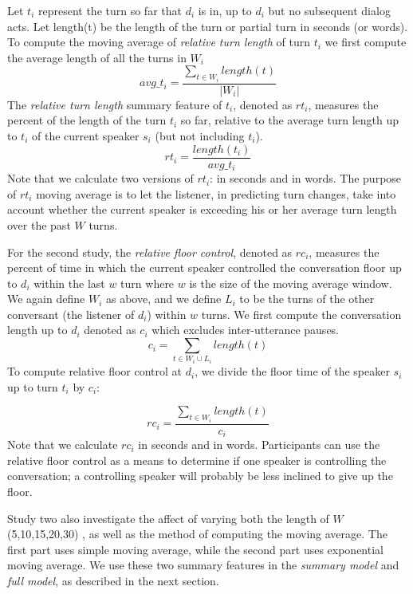      Let $t_i$ represent the turn so far that $d_i$ is in, up to $d_i$ but no subsequent dialog acts. Let length(t) be the length of the turn or partial turn in seconds (or words). To compute the moving average of  \textit{relative turn length} of turn $t_i$ we first compute the average length of all the turns in $W_i$
%
    \begin{equation}
     avg\_t_i = \frac{\sum_{t \in W_i} length(t)}{|W_i|}
     \end{equation}
     The \textit{relative turn length} summary feature of $t_i$, denoted as $rt_i$, measures the percent of the length of the turn $t_i$ so far, relative to the average turn length up to $t_i$ of the current speaker $s_i$ (but not including $t_i$).
%
     \begin{equation}
            rt_i =  \frac{length(t_i)} {avg\_t_i}
     \end{equation}
     Note that we calculate two versions of $rt_i$: in seconds and in words.  The purpose of $rt_i$ moving average is to let the listener, in predicting turn changes, take into account whether the current speaker is exceeding his or her average turn length over the past $W$ turns.

     For the second study, the \textit{relative floor control}, denoted as $rc_i$, measures the percent of time in which the current speaker controlled the conversation floor up to $d_i$ within the last $w$ turn where $w$ is the size of the moving average window. We again define $W_i$ as above, and we define $L_i$ to be the turns of the other conversant (the listener of $d_i$) within $w$ turns. We first compute the conversation length up to $d_i$ denoted as $c_i$ which excludes inter-utterance pauses.
     \begin{equation}
         c_i = \sum_{t \in W_i \cup L_i} length(t)
     \end{equation}
     To compute relative floor control at $d_i$, we divide the floor time of the speaker $s_i$ up to turn $t_i$ by $c_i$:

     \begin{equation}
        rc_i = \frac{\sum_{t \in W_i} length(t)} {c_i}
     \end{equation}
     Note that we calculate $rc_i$ in seconds and in words. Participants can use the relative floor control as a means to determine if one speaker is controlling the conversation; a controlling speaker will probably be less inclined to give up the floor.

     Study two also investigate the affect of varying both the length of $W$ (5,10,15,20,30) , as well as the method of computing the moving average. The first part uses simple moving average, while the second part uses exponential moving average. We use these two summary features in the \textit{summary model} and \textit{full model}, as described in the next section.


